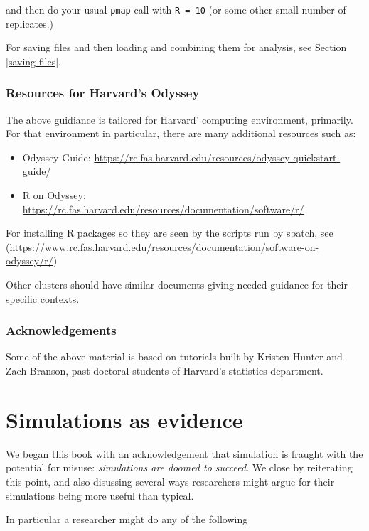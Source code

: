 \documentclass[
]{book}
\providecommand{\tightlist}{%
  \setlength{\itemsep}{0pt}\setlength{\parskip}{0pt}}
\begin{document}
and then do your usual \texttt{pmap} call with \texttt{R\ =\ 10} (or some other small number of replicates.)

For saving files and then loading and combining them for analysis, see Section \ref{saving-files}.

\subsection{Resources for Harvard's Odyssey}\label{resources-for-harvards-odyssey}

The above guidiance is tailored for Harvard' computing environment, primarily.
For that environment in particular, there are many additional resources such as:

\begin{itemize}
\tightlist
\item
  Odyssey Guide: \url{https://rc.fas.harvard.edu/resources/odyssey-quickstart-guide/}
\item
  R on Odyssey: \url{https://rc.fas.harvard.edu/resources/documentation/software/r/}
\end{itemize}

For installing R packages so they are seen by the scripts run by sbatch, see (\url{https://www.rc.fas.harvard.edu/resources/documentation/software-on-odyssey/r/})

Other clusters should have similar documents giving needed guidance for their specific contexts.

\subsection{Acknowledgements}\label{acknowledgements-1}

Some of the above material is based on tutorials built by Kristen Hunter and Zach Branson, past doctoral students of Harvard's statistics department.

\chapter{Simulations as evidence}\label{simulations-as-evidence}

We began this book with an acknowledgement that simulation is fraught with the potential for misuse: \emph{simulations are doomed to succeed}.
We close by reiterating this point, and also disussing several ways researchers might argue for their simulations being more useful than typical.

In particular a researcher might do any of the following
\end{document}
